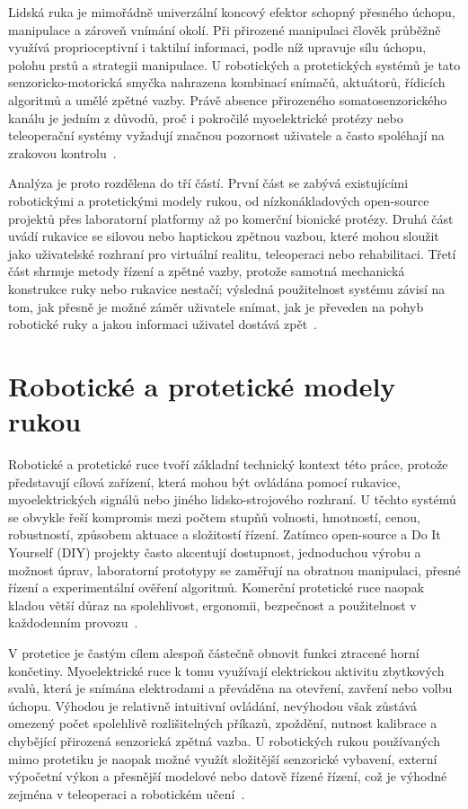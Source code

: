 \documentclass[FZS,DP]{tulthesis}
\begin{document}
Lidská ruka je mimořádně univerzální koncový efektor schopný přesného úchopu, manipulace a zároveň vnímání okolí. Při přirozené manipulaci člověk průběžně využívá proprioceptivní i taktilní informaci, podle níž upravuje sílu úchopu, polohu prstů a strategii manipulace. U robotických a protetických systémů je tato senzoricko-motorická smyčka nahrazena kombinací snímačů, aktuátorů, řídicích algoritmů a umělé zpětné vazby. Právě absence přirozeného somatosenzorického kanálu je jedním z důvodů, proč i pokročilé myoelektrické protézy nebo teleoperační systémy vyžadují značnou pozornost uživatele a často spoléhají na zrakovou kontrolu~\cite{Ninu2014,Thomas2023110,Trajlinek2021}.

Analýza je proto rozdělena do tří částí. První část se zabývá existujícími robotickými a protetickými modely rukou, od nízkonákladových open-source projektů přes laboratorní platformy až po komerční bionické protézy. Druhá část uvádí rukavice se silovou nebo haptickou zpětnou vazbou, které mohou sloužit jako uživatelské rozhraní pro virtuální realitu, teleoperaci nebo rehabilitaci. Třetí část shrnuje metody řízení a zpětné vazby, protože samotná mechanická konstrukce ruky nebo rukavice nestačí; výsledná použitelnost systému závisí na tom, jak přesně je možné záměr uživatele snímat, jak je převeden na pohyb robotické ruky a jakou informaci uživatel dostává zpět~\cite{Belcamino2024,Song2023823,Xiong2024}.

\section{Robotické a protetické modely rukou}

Robotické a protetické ruce tvoří základní technický kontext této práce, protože představují cílová zařízení, která mohou být ovládána pomocí rukavice, myoelektrických signálů nebo jiného lidsko-strojového rozhraní. U těchto systémů se obvykle řeší kompromis mezi počtem stupňů volnosti, hmotností, cenou, robustností, způsobem aktuace a složitostí řízení. Zatímco open-source a Do It Yourself (DIY) projekty často akcentují dostupnost, jednoduchou výrobu a možnost úprav, laboratorní prototypy se zaměřují na obratnou manipulaci, přesné řízení a experimentální ověření algoritmů. Komerční protetické ruce naopak kladou větší důraz na spolehlivost, ergonomii, bezpečnost a použitelnost v každodenním provozu~\cite{Koprnicky2017eng,Koprnicky2019,Najman2017,Thomas2023110}.

V protetice je častým cílem alespoň částečně obnovit funkci ztracené horní končetiny. Myoelektrické ruce k tomu využívají elektrickou aktivitu zbytkových svalů, která je snímána elektrodami a převáděna na otevření, zavření nebo volbu úchopu. Výhodou je relativně intuitivní ovládání, nevýhodou však zůstává omezený počet spolehlivě rozlišitelných příkazů, zpoždění, nutnost kalibrace a chybějící přirozená senzorická zpětná vazba. U robotických rukou používaných mimo protetiku je naopak možné využít složitější senzorické vybavení, externí výpočetní výkon a přesnější modelové nebo datově řízené řízení, což je výhodné zejména v teleoperaci a robotickém učení~\cite{Ninu2014,Song2023823,Mizrahi2023,Zhang2025}.
\end{document}
